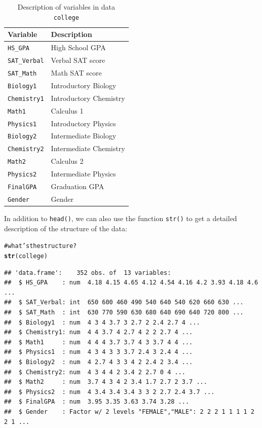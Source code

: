 \documentclass[12pt]{book}\usepackage{graphicx, color}
\makeatletter
\newcommand{\hlfunctioncall}[1]{\textcolor[rgb]{0.501960784313725,0,0.329411764705882}{\textbf{#1}}}%
\newcommand{\hlcomment}[1]{\textcolor[rgb]{0.180392156862745,0.6,0.341176470588235}{#1}}%
\newenvironment{kframe}{%
 \def\at@end@of@kframe{}%
 \ifinner\ifhmode%
  \def\at@end@of@kframe{\end{minipage}}%
  \begin{minipage}{\columnwidth}%
 \fi\fi%
 \def\FrameCommand##1{\hskip\@totalleftmargin \hskip-\fboxsep
 \colorbox{shadecolor}{##1}\hskip-\fboxsep
     \hskip-\linewidth \hskip-\@totalleftmargin \hskip\columnwidth}%
 \MakeFramed {\advance\hsize-\width
   \@totalleftmargin\z@ \linewidth\hsize
   \@setminipage}}%
 {\par\unskip\endMakeFramed%
 \at@end@of@kframe}
\newenvironment{knitrout}{}{} %
\newcommand{\code}[1]{\texttt{#1}}
\makeatother
\begin{document}
\begin{table}[h]
 \caption{Description of variables in data \code{college}} 
 \centering
 \begin{tabular}{l l}
  \hline
  Variable & Description \\
  \hline
  \code{HS\_GPA} & High School GPA  \\
  \code{SAT\_Verbal} & Verbal SAT score \\
  \code{SAT\_Math} & Math SAT score \\
  \code{Biology1} & Introductory Biology \\
  \code{Chemistry1} & Introductory Chemistry \\
  \code{Math1} & Calculus 1 \\
  \code{Physics1} & Introductory Physics \\
  \code{Biology2} & Intermediate Biology \\
  \code{Chemistry2} & Intermediate Chemistry \\
  \code{Math2} & Calculus 2 \\
  \code{Physics2} & Intermediate Physics \\
  \code{FinalGPA} & Graduation GPA \\
  \code{Gender} & Gender \\
  \hline
 \end{tabular}
 \label{tab:college}
\end{table}

In addition to \code{head()}, we can also use the function \code{str()} to get a detailed description of the structure of the data:
\begin{knitrout}\small
{}\color{fgcolor}\begin{kframe}
\begin{alltt}
\hlcomment{# what's the structure?}
\hlfunctioncall{str}(college)
\end{alltt}
\begin{verbatim}
## 'data.frame':	352 obs. of  13 variables:
##  $ HS_GPA    : num  4.18 4.15 4.65 4.12 4.54 4.16 4.2 3.93 4.18 4.6 ...
##  $ SAT_Verbal: int  650 600 460 490 540 640 540 620 660 630 ...
##  $ SAT_Math  : int  630 770 590 630 680 640 690 640 720 800 ...
##  $ Biology1  : num  4 3 4 3.7 3 2.7 2 2.4 2.7 4 ...
##  $ Chemistry1: num  4 4 3.7 4 2.7 4 2 2 2.7 4 ...
##  $ Math1     : num  4 4 4 3.7 3.7 4 3 3.7 4 4 ...
##  $ Physics1  : num  4 3 4 3 3 3.7 2.4 3 2.4 4 ...
##  $ Biology2  : num  4 2.7 4 3 3 4 2 2.4 2 3.4 ...
##  $ Chemistry2: num  4 3 4 4 2 3.4 2 2.7 0 4 ...
##  $ Math2     : num  3.7 4 3 4 2 3.4 1.7 2.7 2 3.7 ...
##  $ Physics2  : num  4 3.4 3.4 3.4 3 3 2 2.7 2.4 3.7 ...
##  $ FinalGPA  : num  3.95 3.35 3.63 3.74 3.28 ...
##  $ Gender    : Factor w/ 2 levels "FEMALE","MALE": 2 2 2 1 1 1 1 2 2 1 ...
\end{verbatim}
\end{kframe}
\end{knitrout}
\end{document}
